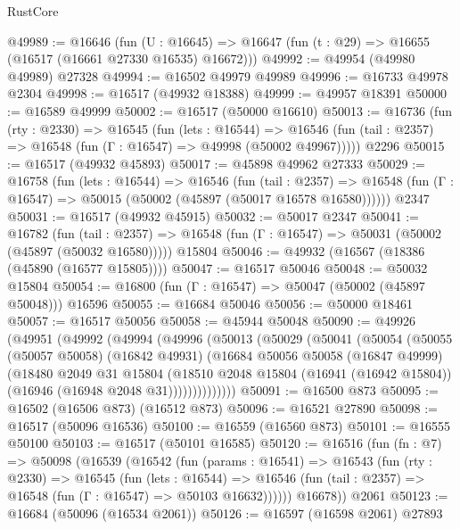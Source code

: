 \begin{lexlean}{RustCore}
\begin{coremodule}
@49989 := @16646
    (fun (U : @16645) => @16647 (fun (t : @29) => @16655 (@16517 (@16661 @27330 @16535) @16672)))
@49992 := @49954 (@49980 @49989) @27328
@49994 := @16502 @49979 @49989
@49996 := @16733 @49978 @2304
@49998 := @16517 (@49932 @18388)
@49999 := @49957 @18391
@50000 := @16589 @49999
@50002 := @16517 (@50000 @16610)
@50013 := @16736
    (fun (rty : @2330) =>
    @16545
      (fun (lets : @16544) =>
      @16546 (fun (tail : @2357) => @16548 (fun (Γ : @16547) => @49998 (@50002 @49967)))))
    @2296
@50015 := @16517 (@49932 @45893)
@50017 := @45898 @49962 @27333
@50029 := @16758
    (fun (lets : @16544) =>
    @16546
      (fun (tail : @2357) =>
      @16548 (fun (Γ : @16547) => @50015 (@50002 (@45897 (@50017 @16578 @16580))))))
    @2347
@50031 := @16517 (@49932 @45915)
@50032 := @50017 @2347
@50041 := @16782
    (fun (tail : @2357) => @16548 (fun (Γ : @16547) => @50031 (@50002 (@45897 (@50032 @16580)))))
    @15804
@50046 := @49932 (@16567 (@18386 (@45890 (@16577 @15805))))
@50047 := @16517 @50046
@50048 := @50032 @15804
@50054 := @16800 (fun (Γ : @16547) => @50047 (@50002 (@45897 @50048))) @16596
@50055 := @16684 @50046
@50056 := @50000 @18461
@50057 := @16517 @50056
@50058 := @45944 @50048
@50090 := @49926
    (@49951
      (@49992
        (@49994
          (@49996
            (@50013
              (@50029
                (@50041
                  (@50054
                    (@50055
                      (@50057 @50058)
                      (@16842 @49931)
                      (@16684
                        @50056
                        @50058
                        (@16847 @49999)
                        (@18480
                          @2049
                          @31
                          @15804
                          (@18510
                            @2048
                            @15804
                            (@16941 (@16942 @15804))
                            (@16946 (@16948 @2048 @31))))))))))))))
@50091 := @16500 @873
@50095 := @16502 (@16506 @873) (@16512 @873)
@50096 := @16521 @27890
@50098 := @16517 (@50096 @16536)
@50100 := @16559 (@16560 @873)
@50101 := @16555 @50100
@50103 := @16517 (@50101 @16585)
@50120 := @16516
    (fun (fn : @7) =>
    @50098
      (@16539
        (@16542
          (fun (params : @16541) =>
          @16543
            (fun (rty : @2330) =>
            @16545
              (fun (lets : @16544) =>
              @16546 (fun (tail : @2357) => @16548 (fun (Γ : @16547) => @50103 @16632))))))
        @16678))
    @2061
@50123 := @16684 (@50096 (@16534 @2061))
@50126 := @16597 (@16598 @2061) @27893

\end{coremodule}
\end{lexlean}
